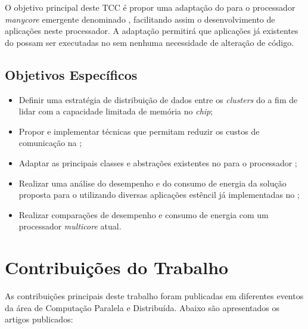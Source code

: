 O objetivo principal deste TCC é propor uma adaptação do \fw \pskel para o processador \textit{manycore}
emergente denominado \mppa, facilitando assim o desenvolvimento de aplicações \stencil neste processador.
A adaptação permitirá que aplicações já existentes do \pskel possam ser executadas
no \mppa sem nenhuma necessidade de alteração de código.

\subsection{Objetivos Específicos}

\begin{itemize}
	\item Definir uma estratégia de distribuição de dados entre os \textit{clusters} do \mppa a fim de
	lidar com a capacidade limitada de memória no \textit{chip};
	\item Propor e implementar técnicas que permitam reduzir os custos de comunicação na \noc;
	\item Adaptar as principais classes e abstrações existentes no \pskel para o processador \mppa;
	\item Realizar uma análise do desempenho e do consumo de energia da solução proposta para o \mppa
	utilizando diversas aplicações estêncil já implementadas no \pskel;
	\item Realizar comparações de desempenho e consumo de energia com um processador \textit{multicore} atual.
\end{itemize}

\section{Contribuições do Trabalho}

As contribuições principais deste trabalho foram publicadas em diferentes eventos da área de Computação Paralela e Distribuída.
Abaixo são apresentados os artigos publicados:

